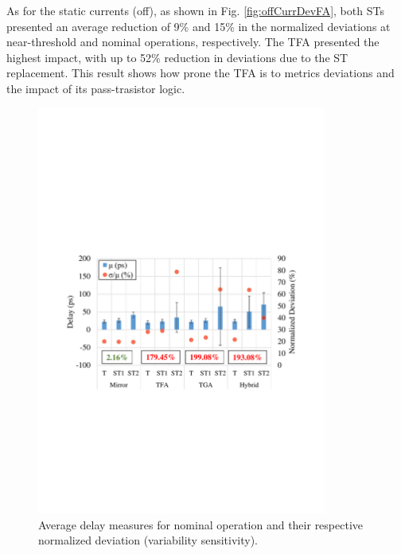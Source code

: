 \documentclass[diss,pgmicro,english]{iiufrgs}
\begin{document}
As for the static currents (off), as shown in Fig. \ref{fig:offCurrDevFA}, both STs presented an average reduction of 9\% and 15\% in the normalized deviations at near-threshold and nominal operations, respectively. The TFA presented the highest impact, with up to 52\% reduction in deviations due to the ST replacement. This result shows how prone the TFA is to metrics deviations and the impact of its pass-trasistor logic.

\begin{figure}[h]
  \centering
    \includegraphics[width=0.85\textwidth, trim={2cm 10cm 2cm 10.5cm}, clip]{averageDelayNominal.pdf}
     \caption{Average delay measures for nominal operation and their respective normalized deviation (variability sensitivity).}
  \label{fig:avgDelayNominal}
\end{figure}

\vspace{-1em}
\end{document}
